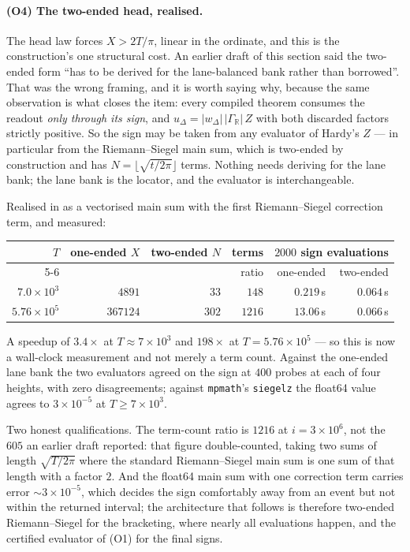 \documentclass[11pt]{article}
\theoremstyle{plain}
\theoremstyle{definition}
\theoremstyle{remark}
\newcommand{\R}{\mathbb{R}}
\newcommand{\GR}{\Gamma_{\R}}
\newcommand{\lean}[1]{\texttt{\detokenize{#1}}}
\begin{document}
\paragraph{(O4) The two-ended head, realised.}
The head law forces $X>2T/\pi$, linear in the ordinate, and this is the construction's
one structural cost. An earlier draft of this section said the two-ended form ``has to
be derived for the lane-balanced bank rather than borrowed''. That was the wrong
framing, and it is worth saying why, because the same observation is what closes the
item: every compiled theorem consumes the readout \emph{only through its sign}, and
$u_\Delta=\lvert w_\Delta\rvert\,\lvert\GR\rvert\,Z$ with both discarded factors
strictly positive. So the sign may be taken from any evaluator of Hardy's $Z$ --- in
particular from the Riemann--Siegel main sum, which is two-ended by construction and has
$N=\lfloor\sqrt{t/2\pi}\rfloor$ terms. Nothing needs deriving for the lane bank; the
lane bank is the locator, and the evaluator is interchangeable.

Realised in \lean{extractor/checks/two_ended_head.py} as a vectorised \lean{float64}
main sum with the first Riemann--Siegel correction term, and measured:

\begin{center}\footnotesize
\begin{tabular}{@{}rrrrrr@{}}
\toprule
$T$ & one-ended $X$ & two-ended $N$ & terms & \multicolumn{2}{c}{$2000$ sign evaluations}\\
\cmidrule(l){5-6}
 & & & ratio & one-ended & two-ended\\
\midrule
$7.0\times10^{3}$ & $4891$ & $33$ & $148$ & $0.219$\,s & $0.064$\,s\\
$5.76\times10^{5}$ & $367124$ & $302$ & $1216$ & $13.06$\,s & $0.066$\,s\\
\bottomrule
\end{tabular}
\end{center}

\noindent
A speedup of $3.4\times$ at $T\approx7\times10^{3}$ and $198\times$ at
$T=5.76\times10^{5}$ --- so this is now a wall-clock measurement and not merely a term
count. Against the one-ended lane bank the two evaluators agreed on the sign at
$400$ probes at each of four heights, with zero disagreements; against
\texttt{mpmath}'s \texttt{siegelz} the float64 value agrees to $3\times10^{-5}$ at
$T\ge7\times10^{3}$.

Two honest qualifications. The term-count ratio is $1216$ at $i=3\times10^{6}$, not the
$605$ an earlier draft reported: that figure double-counted, taking two sums of length
$\sqrt{T/2\pi}$ where the standard Riemann--Siegel main sum is one sum of that length
with a factor $2$. And the float64 main sum with one correction term carries error
$\sim3\times10^{-5}$, which decides the sign comfortably away from an event but not
within the returned interval; the architecture that follows is therefore two-ended
Riemann--Siegel for the bracketing, where nearly all evaluations happen, and the
certified evaluator of (O1) for the final signs.
\end{document}
